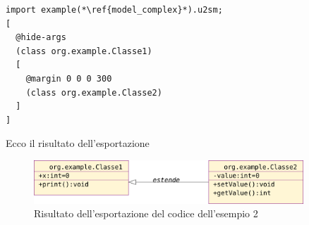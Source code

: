 \begin{lstlisting}[language=layout, caption={Un esempio un po' più complesso}, style={layout}, label=layout_simple]
import example(*\ref{model_complex}*).u2sm;
[
  @hide-args
  (class org.example.Classe1)
  [
    @margin 0 0 0 300
    (class org.example.Classe2)
  ]
]
\end{lstlisting}

Ecco il risultato dell'esportazione

\begin{figure}[htp]
\begin{center}
  \includegraphics[width=0.9\textwidth]{img/esempio2.png}
  \caption[labelInTOC]{Risultato dell'esportazione del codice dell'esempio 2}
\end{center}
\end{figure}
